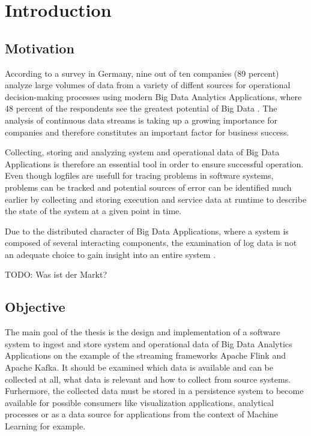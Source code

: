 \chapter{Introduction}

\section{Motivation}
According to a survey in Germany, nine out of ten companies (89 percent) analyze large
volumes of data from a variety of diffent sources for operational decision-making processes
using modern Big Data Analytics Applications, where 48 percent of the respondents see the
greatest potential of Big Data \cite{Bitk14}. The analysis of continuous data streams is
taking up a growing importance for companies and therefore constitutes an important factor
for business success.

Collecting, storing and analyzing system and operational data of Big Data Applications is
therefore an essential tool in order to ensure successful operation. Even though logfiles are
usefull for tracing problems in software systems, problems can be tracked and potential sources
of error can be identified much earlier by collecting and storing execution and service data at
runtime to describe the state of the system at a given point in time.

Due to the distributed character of Big Data Applications, where a system is composed of several
interacting components, the examination of log data is not an adequate choice to gain insight
into an entire system \cite{VanL14}.

TODO: Was ist der Markt?


\section{Objective}

The main goal of the thesis is the design and implementation of a software system to ingest
and  store system and operational data of Big Data Analytics Applications on the example of
the streaming frameworks Apache Flink and Apache Kafka. It should be examined which data is
available and can be collected at all, what data is relevant and how to collect from source
systems. Furhermore, the collected data must be stored in a persistence system to become
available for possible consumers like visualization applications, analytical processes or as
a data source for applications from the context of Machine Learning for example.

